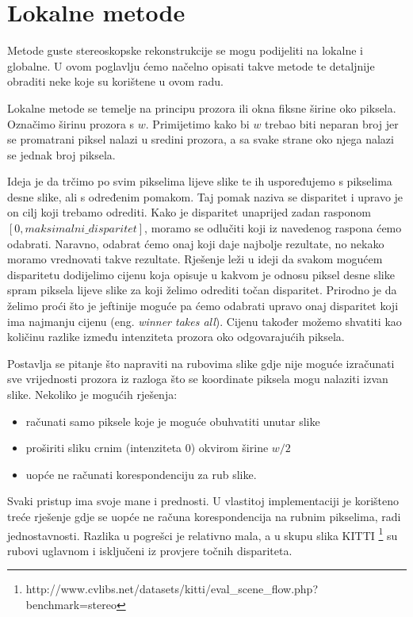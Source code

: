 \documentclass[utf8, zavrsni, numeric]{fer}
\begin{document}
\chapter{Lokalne metode}
Metode guste stereoskopske rekonstrukcije se mogu podijeliti na lokalne i globalne. U ovom poglavlju ćemo načelno opisati takve metode te detaljnije obraditi neke koje su korištene u ovom radu.

Lokalne metode se temelje na principu prozora ili okna fiksne širine oko piksela. Označimo širinu prozora s $w$. Primijetimo kako bi $w$ trebao biti neparan broj jer se promatrani piksel
nalazi u sredini prozora, a sa svake strane oko njega nalazi se jednak broj piksela.

Ideja je da trčimo po svim pikselima lijeve slike te ih uspoređujemo s pikselima desne slike, ali
s određenim pomakom. Taj pomak naziva se disparitet i upravo je on cilj koji trebamo odrediti.
Kako je disparitet unaprijed zadan rasponom $[0, maksimalni\_disparitet]$, moramo se odlučiti
koji iz navedenog raspona ćemo odabrati. Naravno, odabrat ćemo onaj koji daje najbolje rezultate, no nekako moramo vrednovati takve rezultate. Rješenje leži u ideji da svakom mogućem
disparitetu dodijelimo cijenu koja opisuje u kakvom je odnosu piksel desne slike spram piksela
lijeve slike za koji želimo odrediti točan disparitet. Prirodno je da želimo proći što je
jeftinije moguće pa ćemo odabrati upravo onaj disparitet koji ima najmanju cijenu (eng. {\sl winner takes all}). Cijenu
također možemo shvatiti kao količinu razlike između intenziteta prozora oko odgovarajućih piksela.

Postavlja se pitanje što napraviti na rubovima slike gdje nije moguće izračunati sve vrijednosti prozora iz razloga što se koordinate piksela mogu nalaziti izvan slike. Nekoliko je mogućih rješenja:
\begin{itemize}
  \item računati samo piksele koje je moguće obuhvatiti unutar slike
  \item proširiti sliku crnim (intenziteta 0) okvirom širine $w/2$
  \item uopće ne računati korespondenciju za rub slike.
\end{itemize}

Svaki pristup ima svoje mane i prednosti. U vlastitoj implementaciji je korišteno treće rješenje gdje se uopće ne računa korespondencija na rubnim pikselima, radi jednostavnosti. Razlika u pogrešci je relativno
mala, a u skupu slika KITTI \footnote{http://www.cvlibs.net/datasets/kitti/eval\_scene\_flow.php?benchmark=stereo} su rubovi uglavnom i isključeni iz provjere točnih dispariteta.
\end{document}
